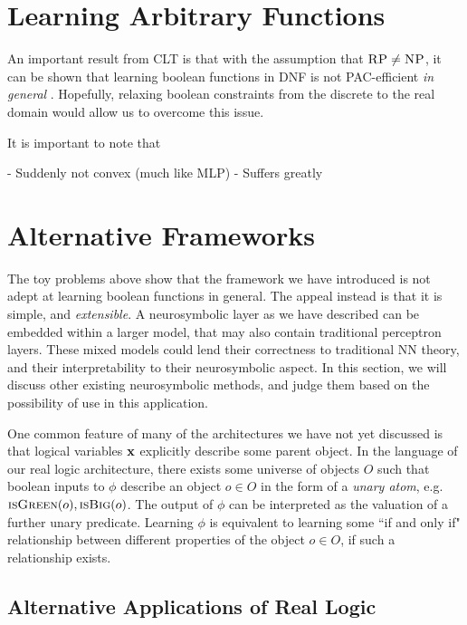 \pagebreak

\section{Learning Arbitrary Functions}

An important result from CLT is that with the assumption that $\textsc{RP} \neq \textsc{NP}$, it can be shown that learning boolean functions in DNF is not PAC-efficient \textit{in general} \cite{clt}. Hopefully, relaxing boolean constraints from the discrete to the real domain would allow us to overcome this issue.



It is important to note that 

- Suddenly not convex (much like MLP)
- Suffers greatly


\section{Alternative Frameworks}

The toy problems above show that the framework we have introduced is not adept at learning boolean functions in general. The appeal instead is that it is simple, and \textit{extensible}. A neurosymbolic layer as we have described can be embedded within a larger model, that may also contain traditional perceptron layers. These mixed models could lend their correctness to traditional NN theory, and their interpretability to their neurosymbolic aspect. In this section, we will discuss other existing neurosymbolic methods, and judge them based on the possibility of use in this application.

One common feature of many of the architectures we have not yet discussed is that logical variables $\mathbf{x}$ explicitly describe some parent object. In the language of our real logic architecture, there exists some universe of objects $O$ such that boolean inputs to $\phi$ describe an object $o \in O$ in the form of a \textit{unary atom}, e.g. $\textsc{isGreen}(o), \textsc{isBig}(o)$. The output of $\phi$ can be interpreted as the valuation of a further unary predicate. Learning $\phi$ is equivalent to learning some ``if and only if" relationship between different properties of the object $o\in O$, if such a relationship exists. 

\subsection{Alternative Applications of Real Logic}

